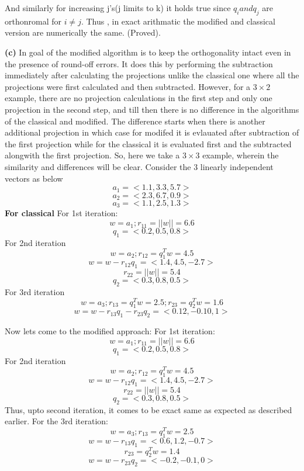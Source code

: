 \documentclass{article}
\renewcommand\part[1]{\vspace{.10in}\textbf{(#1)}}
\begin{document}
 And similarly for increasing j's(j limits to k) it holds true since $q_i and q_j$ are orthonromal for $i\neq j$. Thus , in exact arithmatic the modified and classical version are numerically the same. (Proved). \newline

 \part{c} In goal of the modified algorithm is to keep the orthogonality intact even in the presence of round-off errors. It does this by performing the subtraction immediately after calculating the projections unlike the classical one where all the projections were first calculated and then subtracted. However, for a $3\times2$ example, there are no projection calculations in the first step and only one projection in the second step, and till then there is no difference in the algorithms of the classical and modified. The difference starts when there is another additional projection in which case for modifed it is evlauated after subtraction of the first projection while for the classical it is evaluated first and the subtracted alongwith the first projection. \newline
 So, here we take a $3\times 3$ example, wherein the similarity and differences will be clear. Consider the 3 linearly independent vectors as below \newline
 \[ a_1 = <1.1, 3.3, 5.7>\]
 \[ a_2 = <2.3, 6.7, 0.9>\]
 \[ a_3 = <1.1, 2.5, 1.3>\]
 \textbf {For classical} \newline
 For 1st iteration: 
 \[w = a_1; r_{11} = ||w|| = 6.6\]
 \[ q_1 = <0.2, 0.5, 0.8>    \]
 For 2nd iteration
 \[w = a_2; r_{12} = q_{1}^Tw = 4.5    \]
 \[w = w - r_{12}q_1 = <1.4, 4.5, -2.7> \]
 \[r_{22} = ||w|| = 5.4    \]
 \[q_2 = <0.3, 0.8, 0.5>    \]
 For 3rd iteration
 \[w = a_3; r_{13} = q_{1}^Tw = 2.5 ; r_{23} = q_{2}^Tw = 1.6  \]
 \[w = w - r_{13}q_1 - r_{23}q_2 = <0.12, -0.1 0,1>    \]

 Now lets come to the modified approach:
 For 1st iteration: 
 \[w = a_1; r_{11} = ||w|| = 6.6\]
 \[ q_1 = <0.2, 0.5, 0.8>    \]
 For 2nd iteration
 \[w = a_2; r_{12} = q_{1}^Tw = 4.5    \]
 \[w = w - r_{12}q_1 = <1.4, 4.5, -2.7> \]
 \[r_{22} = ||w|| = 5.4    \]
 \[q_2 = <0.3, 0.8, 0.5>    \]
 Thus, upto second iteration, it comes to be exact same as expected as described earlier. \newline
 For the 3rd iteration:
 \[w = a_3; r_{13} = q_{1}^Tw = 2.5 \]
 \[w = w - r_{13}q_1 =  <0.6, 1.2, -0.7>    \]
 \[r_{23} = q_{2}^Tw = 1.4   \]
 \[w = w - r_{23}q_2 = <-0.2, -0.1, 0>    \]
\end{document}
